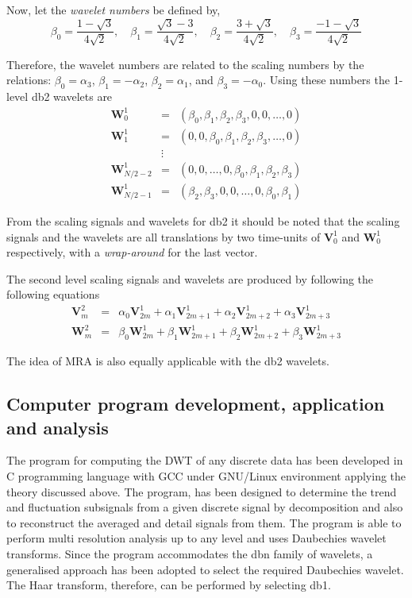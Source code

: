 \documentclass[a4paper,11pt]{report}
\begin{document}
Now, let the \emph{wavelet numbers} be defined by,
\begin{equation}
\beta_{0}=\frac{1-\sqrt{3}}{4\sqrt{2}}, \quad \beta_{1}=\frac{\sqrt{3}-3}{4\sqrt{2}}, \quad \beta_{2}=\frac{3+\sqrt{3}}{4\sqrt{2}}, \quad \beta_{3}=\frac{-1-\sqrt{3}}{4\sqrt{2}}
\end{equation}

Therefore, the wavelet numbers are related to the scaling numbers by the relations: $\beta_{0}=\alpha_{3}$, $\beta_{1}=-\alpha_{2}$, $\beta_{2}=\alpha_{1}$, and $\beta_{3}=-\alpha_{0}$. Using these numbers the 1-level db2 wavelets are
\begin{eqnarray}
\mathbf{W}_{0}^{1} & = & ( \beta_{0},\beta_{1},\beta_{2},\beta_{3},0,0,\ldots,0 ) \nonumber \\
\mathbf{W}_{1}^{1} & = & ( 0,0,\beta_{0},\beta_{1},\beta_{2},\beta_{3},\ldots,0 ) \nonumber \\
	 & \vdots & 	\nonumber \\
\mathbf{W}_{N/2-2}^{1} & = & ( 0,0,\ldots,0,\beta_{0},\beta_{1},\beta_{2},\beta_{3} ) \nonumber \\ 
\mathbf{W}_{N/2-1}^{1} & = & ( \beta_{2},\beta_{3},0,0,\ldots,0,\beta_{0},\beta_{1} )  
\end{eqnarray}

From the scaling signals and wavelets for db2 it should be noted that the scaling signals and the wavelets are all translations by two time-units of $\mathbf{V}_{0}^{1}$ and $\mathbf{W}_{0}^{1}$ respectively, with a \emph{wrap-around} for the last vector.

The second level scaling signals and wavelets are produced by following the following equations
\begin{eqnarray}
\mathbf{V}_{m}^{2} & = & \alpha_{0}\mathbf{V}_{2m}^{1}+\alpha_{1}\mathbf{V}_{2m+1}^{1}+\alpha_{2}\mathbf{V}_{2m+2}^{1}+\alpha_{3}\mathbf{V}_{2m+3}^{1} \\
\mathbf{W}_{m}^{2} & = & \beta_{0}\mathbf{W}_{2m}^{1}+\beta_{1}\mathbf{W}_{2m+1}^{1}+\beta_{2}\mathbf{W}_{2m+2}^{1}+\beta_{3}\mathbf{W}_{2m+3}^{1} 
\end{eqnarray}

The idea of MRA is also equally applicable with the db2 wavelets. \cite{walker}

\subsection{Computer program development, application and analysis}
The program for computing the DWT of any discrete data has been developed in C programming language with GCC under GNU/Linux environment applying the theory discussed above. The program, has been designed to determine the trend and fluctuation subsignals from a given discrete signal by decomposition and also to reconstruct the averaged and detail signals from them. The program is able to perform multi resolution analysis up to any level and uses Daubechies wavelet transforms. Since the program accommodates the dbn family of wavelets, a generalised approach has been adopted to select the required Daubechies wavelet. The Haar transform, therefore, can be performed by selecting db1.
\end{document}

